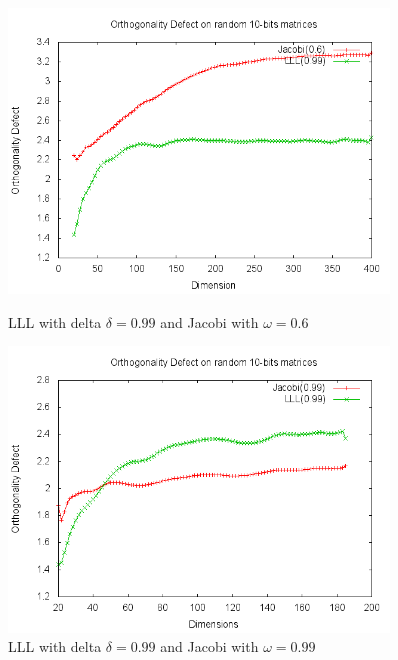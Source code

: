 \documentclass[10pt, a4paper]{article}
\begin{document}
\begin{figure}[H]
\begin{minipage}{.45\textwidth}
  \centering

    \includegraphics[width=0.9\textwidth]{results-graphs/random-matrix-omega-06defect.png}

      \caption{LLL with delta $\delta = 0.99$ and Jacobi with $\omega = 0.6$}
  \label{fig1}
\end{minipage}
\hspace{.05\textwidth}
\begin{minipage}{.45\textwidth}

  \centering

    \includegraphics[width=0.9\textwidth]{results-graphs/random-matrix-omega-09defect.png}

    
  \caption{LLL with delta $\delta = 0.99$ and Jacobi with $\omega = 0.99$}
  \label{fig2}
\end{minipage}
\end{figure}
\end{document}
